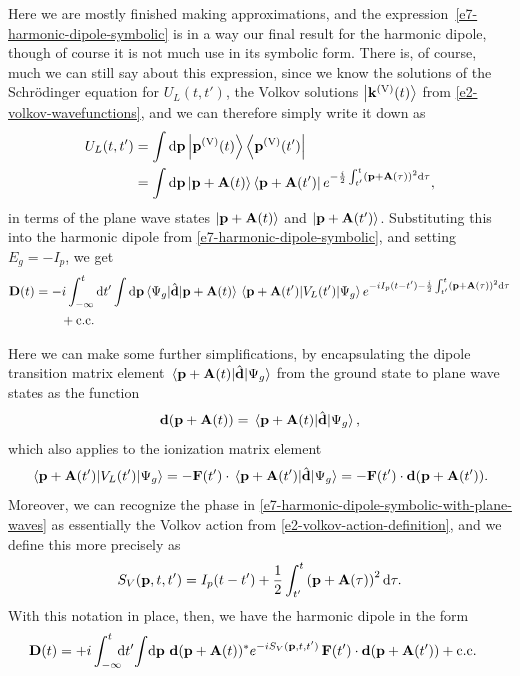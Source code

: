 Here we are mostly finished making approximations, and the expression~\eqref{e7-harmonic-dipole-symbolic} is in a way our final result for the harmonic dipole, though of course it is not much use in its symbolic form. There is, of course, much we can still say about this expression, since we know the solutions of the Schrödinger equation for $U_L(t,t')$, the Volkov solutions $\ket{ \vb{k}^{\mathrm{(V)}}(t)}$ from \eqref{e2-volkov-wavefunctions}, and we can therefore simply write it down as
\begin{align}
U_L(t,t') 
& = 
\int\mathrm{d}\vb{p}  \ket{\vb{p}^{\mathrm{(V)}}(t)}\bra{\vb{p}^{\mathrm{(V)}}(t')}
\nonumber \\ & = 
\int\mathrm{d}\vb{p}
\ket{\vb{p}+\vb{A}(t)}\bra{\vb{p}+\vb{A}(t')}
e^{-\frac{i}{2} \int_{t'}^{t}\left(\vb{p}+\vb{A}(\tau)\right)^2\mathrm{d}\tau}
,
\label{e7-volkov-propagator}
\end{align}
in terms of the plane wave states $\ket{\vb{p}+\vb{A}(t)}$ and $\ket{\vb{p}+\vb{A}(t')}$. Substituting this into the harmonic dipole from \eqref{e7-harmonic-dipole-symbolic}, and setting $E_g=-I_p$, we get
\begin{align}
\vbD(t)
& = 
-i\int_{-\infty}^{t} \d t'
\int\d\vbp
\matrixel{\Psi_g}
  {\hat{\vbd}}
  {\vbp+\vba(t)}
\matrixel{\vbp+\vba(t')}
  {V_L(t')}
  {\Psi_g}
e^{-iI_p(t-t')-\frac{i}{2} \int_{t'}^{t}\left(\vbp+\vba(\tau)\right)^2\d\tau}
\nonumber \\ & \qquad 
+\cc
\label{e7-harmonic-dipole-symbolic-with-plane-waves}
\end{align}

Here we can make some further simplifications, by encapsulating the dipole transition matrix element $\matrixel{\vbp+\vba(t)}{\hat{\vbd}}{\Psi_g}$ from the ground state to plane wave states as the function
\begin{equation}
\vbd(\vbp+\vba(t))
=
\matrixel{\vbp+\vba(t)}{\hat{\vbd}}{\Psi_g},
\end{equation}
which also applies to the ionization matrix element
\begin{equation}
\matrixel{\vbp+\vba(t')}{V_L(t')}{\Psi_g}
 = 
-\vbf(t')\cdot\matrixel{\vbp+\vba(t')}{\hat{\vbd}}{\Psi_g}
 = 
-\vbf(t')\cdot \vbd(\vbp+\vba(t')).
\end{equation}
Moreover, we can recognize the phase in \eqref{e7-harmonic-dipole-symbolic-with-plane-waves} as essentially the Volkov action from \eqref{e2-volkov-action-definition}, and we define this more precisely as
\begin{equation}
S_V(\vb{p},t,t')
=
I_p(t-t')
+\frac{1}{2} \int_{t'}^{t}\left(\vb{p}+\vb{A}(\tau)\right)^2\mathrm{d}\tau
.
\label{e7-volkov-action}
\end{equation}
With this notation in place, then, we have the harmonic dipole in the form
\begin{align}
\vb{D}(t)
& = 
+i\int_{-\infty}^{t} \!\!\! \mathrm{d} t'\!
\int\!\mathrm{d}\vb{p} \,\,
\vb{d}(\vb{p}+\vb{A}(t))^*
e^{-iS_V(\vb{p},t,t')}  \,
\vb{F}(t')\cdot \vb{d}(\vb{p}+\vb{A}(t'))
+\mathrm{c.c.}
\label{e7-harmonic-dipole-momentum-integral}
\end{align}


